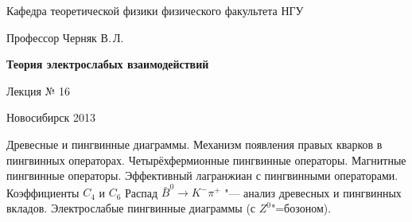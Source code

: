 \documentclass[12pt,pagesize,paper=192mm:108mm]{scrbook}
\begin{document}
\begin{titlepage}
\begin{center}
    Кафедра теоретической физики физического факультета НГУ
    \medskip

    \Large
    Профессор Черняк В.\,Л.
    \bigskip

    \huge
    \textbf{Теория электрослабых взаимодействий}
    \bigskip

    \Large
    Лекция № 16
    \vfill

    \vfill

\normalsize    Новосибирск 2013
  \smallskip

  \ccbysa
  \end{center}
\end{titlepage}
\newpage

\vspace*{-1em}
\begin{center}
 \vfill
  \begin{minipage}{0.66\linewidth}
    Древесные и пингвинные диаграммы. Механизм появления правых
    кварков в пингвинных операторах. Четырёхфермионные пингвинные
    операторы.  Магнитные пингвинные операторы. Эффективный лагранжиан
    с пингвинными операторами. Коэффициенты $C_4$ и $C_6$ Распад
    $\bar{B}^0\to K^-\pi^+$ "--- анализ древесных и пингвинных
    вкладов.  Электрослабые пингвинные диаграммы (с $Z^0$"=бозоном).
  \end{minipage}
  \vfill

\end{center}
\end{document}
